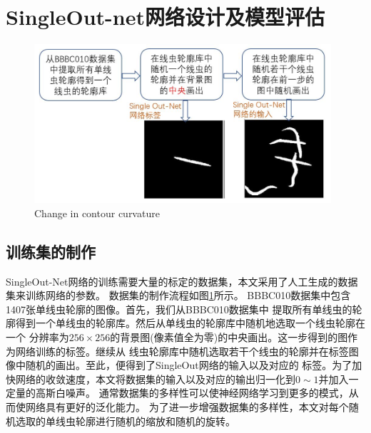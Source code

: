 \section{SingleOut-net网络设计及模型评估}
	\begin{figure}[htb]
	  \centering
	  \includegraphics[width=11cm]{figure/chap4/dataset.jpg}
		{Change in contour curvature}
	  \label{fig:chap4:dataset}
	\end{figure}
\subsection{训练集的制作}
\label{dataset}
	SingleOut-Net网络的训练需要大量的标定的数据集，本文采用了人工生成的数据集来训练网络的参数。
	数据集的制作流程如图\ref{fig:chap4:dataset}所示。
	BBBC010数据集\cite{Ljosa2012Annotated}中包含1407张单线虫轮廓的图像。首先，我们从BBBC010数据集中
	提取所有单线虫的轮廓得到一个单线虫的轮廓库。然后从单线虫的轮廓库中随机地选取一个线虫轮廓在一个
	分辨率为$256\times256$的背景图(像素值全为零)的中央画出。这一步得到的图作为网络训练的标签。继续从
	线虫轮廓库中随机选取若干个线虫的轮廓并在标签图像中随机的画出。至此，便得到了SingleOut网络的输入以及对应的
	标签。为了加快网络的收敛速度，本文将数据集的输入以及对应的输出归一化到$0\sim1$并加入一定量的高斯白噪声。
	通常数据集的多样性可以使神经网络学习到更多的模式，从而使网络具有更好的泛化能力。
	为了进一步增强数据集的多样性，本文对每个随机选取的单线虫轮廓进行随机的缩放和随机的旋转。

